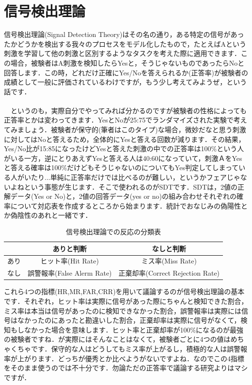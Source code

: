 \documentclass[11pt,a4paper]{ujreport}
\begin{document}
\section{信号検出理論}
信号検出理論(Signal Detection Theory)はその名の通り，ある特定の信号があったかどうかを検出する我々のプロセスをモデル化したもので，たとえばAという刺激を学習して他の刺激と区別するようなタスクを考えた際に適用できます．この場合，被験者はA刺激を検知したらYesと，そうじゃないものであったらNoと回答します．この時，どれだけ正確にYes/Noを答えられるか(正答率)が被験者の成績として一般に評価されているわけですが，もう少し考えてみようぜ，という話です．\\
\\
　というのも，実際自分でやってみれば分かるのですが被験者の性格によっても正答率とかは変わってきます．YesとNoが25:75でランダマイズされた実験で考えてみましょう．被験者が保守的(筆者はこのタイプ)な場合，微妙だなと思う刺激に対してはNoと答えるため，全体的にYesと答える回数が減ります．その結果，Yes/No比が15:85になったけどYesと答えた刺激の中での正答率は100\%という人がいる一方，逆にとりあえずYesと答える人は40:60になっていて，刺激ＡをYesと答える確率は100\%だけどもそうじゃないのについてもYes判定してしまっている人がいたり...単純に正答率だけでは比べるのが難しい，というかフェアじゃないよねという事態が生じます．そこで使われるのがSDTです．SDTは，2値の正解データ(Yes or No)と，2値の回答データ(yes or no)の組み合わせそれぞれの確率について対応表を作成するところから始まります．統計でおなじみの偽陽性とか偽陰性のあれと一緒です．

\begin{table}[H]
  \centering
    \caption{信号検出理論での反応の分類表}
    \begin{tabular}{|l||c|c|}  \hline
       & ありと判断 & なしと判断 \\ \hline \hline
      あり & ヒット率(Hit Rate) & ミス率(Miss Rate)  \\ \hline
      なし & 誤警報率(False Alerm Rate) & 正棄却率(Correct Rejection Rate)  \\ \hline
    \end{tabular}
  \end{table}

これら4つの指標(HR,MR,FAR,CRR)を用いて議論するのが信号検出理論の基本です．それぞれ，ヒット率は実際に信号があった際にちゃんと検知できた割合，ミス率は本当は信号があったのに検知できなかった割合，誤警報率は実際には信号はなかったのにあったと勘違いした割合，正棄却率は実際に信号がなくて，検知もしなかった場合を意味します．ヒット率と正棄却率が100\%になるのが最強の被験者ですね．が実際にはそんなことはなくて，被験者ごとに4つの値はめちゃくちゃです．保守的な人はどうしてもミス率が上がるし，積極的な人は誤警報率が上がります．どっちが優秀とか比べようがないですよね．なのでこの4指標をそのまま使うのでは不十分です．勿論ただの正答率で議論する研究よりはマシですが．\\
\\
\end{document}
